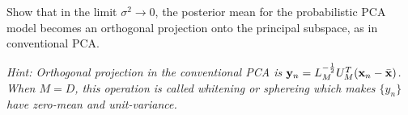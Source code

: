 \documentclass{article}
\theoremstyle{definition}
\theoremstyle{definition}
\theoremstyle{remark}
\begin{document}
Show that in the limit $\sigma^{2}\to 0$, the posterior mean for the probabilistic PCA model becomes an orthogonal projection onto the principal subspace, as in conventional PCA.

\emph{Hint: Orthogonal projection in the conventional PCA is $\bold{y}_{n}=L_{M}^{-\frac{1}{2}}U_{M}^{T}(\bold{x}_{n}-\bar{\bold{x}})$. When $M=D$, this operation is called whitening or sphereing which makes $\{y_{n}\}$ have zero-mean and unit-variance.}
\\






\end{document}
